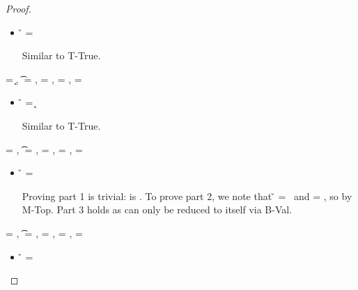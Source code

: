 \begin{lemma}
\begin{proof}
\begin{case}[T-HMap]
  \begin{itemize}
    \item[]
      \begin{subcase}[B-Val] \v{} = {}

        Similar to T-True.
      \end{subcase}
  \end{itemize}
\end{case}

\begin{case}[T-Kw] \e{} = {\k{}},
  \t{} = {\Value{\k{}}},
  \thenprop{\prop{}} = {\topprop{}},
  \elseprop{\prop{}} = {\botprop{}},
  \object{} = {\emptyobject{}}

  \begin{itemize}
    \item[]
      \begin{subcase}[B-Val] \v{} = {\k{}}

        Similar to T-True.
      \end{subcase}
  \end{itemize}
\end{case}

\begin{case}[T-False]
\e{} = \false, \t{} = \False, \thenprop{\prop{}} = \botprop{}, \elseprop{\prop{}} = \topprop{}, \object{} = \emptyobject{}

\begin{itemize}
  \item[] 
    \begin{subcase}[B-Val]
      \v{} = \false{}

Proving part 1 is trivial: \object{} is \emptyobject. To prove part 2, we note that \v{} = \false\ 
and \elseprop{\prop{}} = \topprop{}, so \satisfies{\openv{}}{\elseprop{\prop{}}} by M-Top. 
Part 3 holds as \e{} can only be reduced to itself via B-Val.
\end{subcase}

\end{itemize}
\end{case}

\begin{case}[T-Class] \e{} = {\class{}},
  \t{} = {\Value{\class{}}},
  \thenprop{\prop{}} = {\topprop{}},
  \elseprop{\prop{}} = {\botprop{}},
  \object{} = {\emptyobject{}}

  \begin{itemize}
    \item[]
      \begin{subcase}[B-Val] \v{} = {\class{}}


\end{subcase}
\end{itemize}
\end{case}
\end{proof}
\end{lemma}
